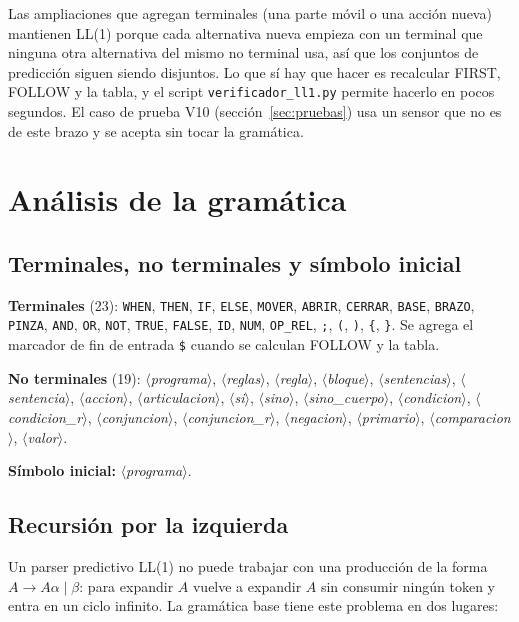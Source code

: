 \documentclass[10pt,a4paper]{article}
\newcommand{\nt}[1]{\ensuremath{\langle}\textit{#1}\ensuremath{\rangle}}   %
\newcommand{\tm}[1]{\texttt{#1}}                                          %
\begin{document}
Las ampliaciones que agregan terminales (una parte móvil o una acción nueva) mantienen LL(1) porque cada alternativa nueva
empieza con un terminal que ninguna otra alternativa del mismo no terminal usa, así que los
conjuntos de predicción siguen siendo disjuntos. Lo que sí hay que hacer es recalcular FIRST,
FOLLOW y la tabla, y el script \tm{verificador\_ll1.py} permite hacerlo en pocos segundos. El
caso de prueba V10 (sección~\ref{sec:pruebas}) usa un sensor que no es de este brazo y se acepta sin tocar la gramática.

\section{Análisis de la gramática}
\label{sec:analisis}

\subsection{Terminales, no terminales y símbolo inicial}

\textbf{Terminales} (23): \tm{WHEN}, \tm{THEN}, \tm{IF}, \tm{ELSE}, \tm{MOVER}, \tm{ABRIR},
\tm{CERRAR}, \tm{BASE}, \tm{BRAZO}, \tm{PINZA}, \tm{AND}, \tm{OR}, \tm{NOT}, \tm{TRUE}, \tm{FALSE},
\tm{ID}, \tm{NUM}, \tm{OP\_REL}, \tm{;}, \tm{(}, \tm{)}, \tm{\{}, \tm{\}}. Se agrega el marcador de
fin de entrada \tm{\$} cuando se calculan FOLLOW y la tabla.

\textbf{No terminales} (19): \nt{programa}, \nt{reglas}, \nt{regla}, \nt{bloque}, \nt{sentencias}, \nt{sentencia}, \nt{accion}, \nt{articulacion}, \nt{si}, \nt{sino}, \nt{sino\_cuerpo}, \nt{condicion}, \nt{condicion\_r}, \nt{conjuncion}, \nt{conjuncion\_r}, \nt{negacion}, \nt{primario}, \nt{comparacion}, \nt{valor}.

\textbf{Símbolo inicial:} \nt{programa}.

\subsection{Recursión por la izquierda}
\label{sec:recursion}

Un parser predictivo LL(1) no puede trabajar con una producción de la forma
$A \rightarrow A\alpha \mid \beta$: para expandir $A$ vuelve a expandir $A$ sin consumir ningún
token y entra en un ciclo infinito. La gramática base tiene este problema en dos lugares:
\end{document}

